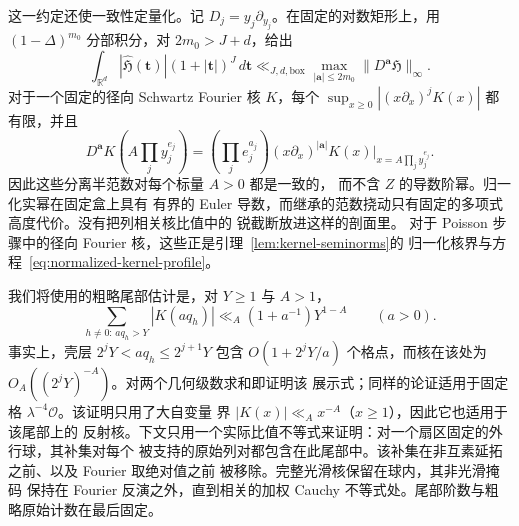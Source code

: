 这一约定还使一致性定量化。记
\(D_j=y_j\partial_{y_j}\)。在固定的对数矩形上，用 \((1-\Delta)^{m_0}\) 分部积分，对 \(2m_0>J+d\)，给出
\begin{equation}\label{eq:inverse-fourier-moment}
 \int_{\mathbb R^d}|\widehat{\mathfrak H}(\boldsymbol t)|
        (1+|\boldsymbol t|)^J\,d\boldsymbol t
 \ll_{J,d,\mathrm{box}}\max_{|\boldsymbol a|\le2m_0}
             \|D^{\boldsymbol a}\mathfrak H\|_\infty.
\end{equation}
对于一个固定的径向 Schwartz Fourier 核 \(K\)，每个
\(\sup_{x\ge0}|(x\partial_x)^jK(x)|\) 都有限，并且
\[
 D^{\boldsymbol a}K\!\left(A\prod_jy_j^{e_j}\right)
 =\left(\prod_je_j^{a_j}\right)
   (x\partial_x)^{|\boldsymbol a|}K(x)
       \big|_{x=A\prod_jy_j^{e_j}}.
\]
因此这些分离半范数对每个标量 \(A>0\) 都是一致的，
而不含 \(Z\) 的导数阶幂。归一化实幂在固定盒上具有
有界的 Euler 导数，而继承的范数挠动只有固定的多项式高度代价。没有把列相关核比值中的
锐截断放进这样的剖面里。
对于 Poisson 步骤中的径向 Fourier 核，这些正是引理~\ref{lem:kernel-seminorms}的
归一化核界与方程~\eqref{eq:normalized-kernel-profile}。

我们将使用的粗略尾部估计是，对 \(Y\ge1\) 与 \(A>1\)，
\begin{equation}\label{eq:inverse-raw-tail}
 \sum_{h\ne0:\,a q_h>Y}|K(aq_h)|
 \ll_A(1+a^{-1})Y^{1-A}\qquad(a>0).
\end{equation}
事实上，壳层 \(2^jY<a q_h\le2^{j+1}Y\) 包含
\(O(1+2^jY/a)\) 个格点，而核在该处为
\(O_A((2^jY)^{-A})\)。对两个几何级数求和即证明该
展示式；同样的论证适用于固定格
\(\lambda^{-4}\mathcal O\)。该证明只用了大自变量
界 \(|K(x)|\ll_Ax^{-A}\)（\(x\ge1\)），因此它也适用于该尾部上的
反射核。下文只用一个实际比值不等式来证明：对一个扇区固定的外行球，其补集对每个
被支持的原始列对都包含在此尾部中。该补集在非互素延拓之前、以及 Fourier 取绝对值之前
被移除。完整光滑核保留在球内，其非光滑掩码
保持在 Fourier 反演之外，直到相关的加权 Cauchy
不等式处。尾部阶数与粗略原始计数在最后固定。

